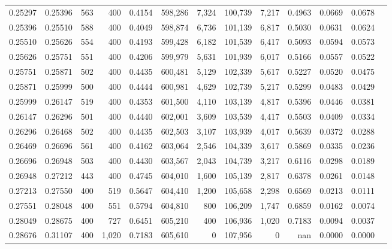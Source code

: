 \begin{tabular}{rrrrrrrrrrrrr}
0.25297 & 0.25396 &    563 &   400 &                                     0.4154 & 598,286 &   7,324 & 100,739 &   7,217 & 0.4963 & 0.0669 & 0.0678 \\
0.25396 & 0.25510 &    588 &   400 &                                     0.4049 & 598,874 &   6,736 & 101,139 &   6,817 & 0.5030 & 0.0631 & 0.0624 \\
0.25510 & 0.25626 &    554 &   400 &                                     0.4193 & 599,428 &   6,182 & 101,539 &   6,417 & 0.5093 & 0.0594 & 0.0573 \\
0.25626 & 0.25751 &    551 &   400 &                                     0.4206 & 599,979 &   5,631 & 101,939 &   6,017 & 0.5166 & 0.0557 & 0.0522 \\
0.25751 & 0.25871 &    502 &   400 &                                     0.4435 & 600,481 &   5,129 & 102,339 &   5,617 & 0.5227 & 0.0520 & 0.0475 \\
0.25871 & 0.25999 &    500 &   400 &                                     0.4444 & 600,981 &   4,629 & 102,739 &   5,217 & 0.5299 & 0.0483 & 0.0429 \\
0.25999 & 0.26147 &    519 &   400 &                                     0.4353 & 601,500 &   4,110 & 103,139 &   4,817 & 0.5396 & 0.0446 & 0.0381 \\
0.26147 & 0.26296 &    501 &   400 &                                     0.4440 & 602,001 &   3,609 & 103,539 &   4,417 & 0.5503 & 0.0409 & 0.0334 \\
0.26296 & 0.26468 &    502 &   400 &                                     0.4435 & 602,503 &   3,107 & 103,939 &   4,017 & 0.5639 & 0.0372 & 0.0288 \\
0.26469 & 0.26696 &    561 &   400 &                                     0.4162 & 603,064 &   2,546 & 104,339 &   3,617 & 0.5869 & 0.0335 & 0.0236 \\
0.26696 & 0.26948 &    503 &   400 &                                     0.4430 & 603,567 &   2,043 & 104,739 &   3,217 & 0.6116 & 0.0298 & 0.0189 \\
0.26948 & 0.27212 &    443 &   400 &                                     0.4745 & 604,010 &   1,600 & 105,139 &   2,817 & 0.6378 & 0.0261 & 0.0148 \\
0.27213 & 0.27550 &    400 &   519 &                                     0.5647 & 604,410 &   1,200 & 105,658 &   2,298 & 0.6569 & 0.0213 & 0.0111 \\
0.27551 & 0.28048 &    400 &   551 &                                     0.5794 & 604,810 &     800 & 106,209 &   1,747 & 0.6859 & 0.0162 & 0.0074 \\
0.28049 & 0.28675 &    400 &   727 &                                     0.6451 & 605,210 &     400 & 106,936 &   1,020 & 0.7183 & 0.0094 & 0.0037 \\
0.28676 & 0.31107 &    400 & 1,020 &                                     0.7183 & 605,610 &       0 & 107,956 &       0 &    nan & 0.0000 & 0.0000 \\
\bottomrule
\end{tabular}
